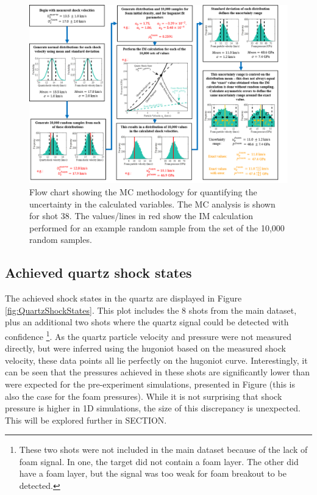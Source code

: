 \begin{landscape}
\begin{figure} 
\begin{centering}
\includegraphics[width=1.5\textwidth]{figures/Experiment/FlowChart.png}%
\caption{\label{fig:MC Flow Chart} Flow chart showing the MC methodology for quantifying the uncertainty in the calculated variables. The MC analysis is shown for shot 38. The values/lines in red show the IM calculation performed for an example random sample from the set of the 10,000 random samples.}
\end{centering}
\end{figure}
\end{landscape}


\subsection{Achieved quartz shock states} \label{Achieved quartz shock states}

The achieved shock states in the quartz are displayed in Figure \ref{fig:QuartzShockStates}. This plot includes the 8 shots from the main dataset, plus an additional two shots where the quartz signal could be detected with confidence \footnote{These two shots were not included in the main dataset because of the lack of foam signal. In one, the target did not contain a foam layer. The other did have a foam layer, but the signal was too weak for foam breakout to be detected.}. As the quartz particle velocity and pressure were not measured directly, but were inferred using the hugoniot based on the measured shock velocity, these data points all lie perfectly on the hugoniot curve. Interestingly, it can be seen that the pressures achieved in these shots are significantly lower than were expected for the pre-experiment simulations, presented in Figure \label{fig:PreExpHydro} (this is also the case for the foam pressures). While it is not surprising that shock pressure is higher in 1D simulations, the size of this discrepancy is unexpected. This will be explored further in SECTION.

